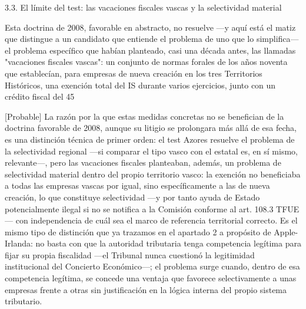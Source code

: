 \documentclass[10pt,a4paper]{article}
\begin{document}
3.3. El límite del test: las vacaciones fiscales vascas y la selectividad material

Esta doctrina de 2008, favorable en abstracto, no resuelve —y aquí está el matiz que distingue a un candidato que entiende el problema de uno que lo simplifica— el problema específico que habían planteado, casi una década antes, las llamadas "vacaciones fiscales vascas": un conjunto de normas forales de los años noventa que establecían, para empresas de nueva creación en los tres Territorios Históricos, una exención total del IS durante varios ejercicios, junto con un crédito fiscal del 45%

[Probable] La razón por la que estas medidas concretas no se benefician de la doctrina favorable de 2008, aunque su litigio se prolongara más allá de esa fecha, es una distinción técnica de primer orden: el test Azores resuelve el problema de la selectividad regional —si comparar el tipo vasco con el estatal es, en sí mismo, relevante—, pero las vacaciones fiscales planteaban, además, un problema de selectividad material dentro del propio territorio vasco: la exención no beneficiaba a todas las empresas vascas por igual, sino específicamente a las de nueva creación, lo que constituye selectividad —y por tanto ayuda de Estado potencialmente ilegal si no se notifica a la Comisión conforme al art. 108.3 TFUE— con independencia de cuál sea el marco de referencia territorial correcto. Es el mismo tipo de distinción que ya trazamos en el apartado 2 a propósito de Apple-Irlanda: no basta con que la autoridad tributaria tenga competencia legítima para fijar su propia fiscalidad —el Tribunal nunca cuestionó la legitimidad institucional del Concierto Económico—; el problema surge cuando, dentro de esa competencia legítima, se concede una ventaja que favorece selectivamente a unas empresas frente a otras sin justificación en la lógica interna del propio sistema tributario.
\end{document}
